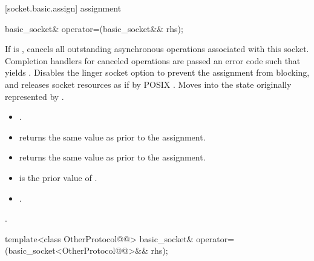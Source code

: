 [socket.basic.assign]{ assignment}

\begin{itemdecl}
basic_socket& operator=(basic_socket&& rhs);
\end{itemdecl}

\begin{itemdescr}
\pnum
\effects If  is , cancels all outstanding asynchronous operations associated with this socket. Completion handlers for canceled operations are passed an error code  such that  yields . Disables the linger socket option to prevent the assignment from blocking, and releases socket resources as if by POSIX . Moves into  the state originally represented by .

\pnum
\postconditions
\begin{itemize}
\item
{}.
\item
{} returns the same value as  prior to the assignment.
\item
{} returns the same value as  prior to the assignment.
\item
{} is the prior value of .
\item
{}.
\end{itemize}

\pnum
\returns {}.
\end{itemdescr}

\begin{itemdecl}
template<class OtherProtocol@@>
  basic_socket& operator=(basic_socket<OtherProtocol@@>&& rhs);
\end{itemdecl}

